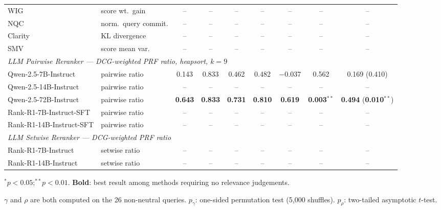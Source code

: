 \begin{table}[htbp]
{\begin{tabular}{@{}llccccccc@{}}
WIG~\cite{zhou2007query}
  & score wt.\ gain  & -- & -- & -- & -- & -- & -- & -- \\

NQC~\cite{shtok2012predicting}
  & norm.\ query commit.  & -- & -- & -- & -- & -- & -- & -- \\

Clarity~\cite{cronen2002predicting}
  & KL divergence  & -- & -- & -- & -- & -- & -- & -- \\

SMV~\cite{tao2014query}
  & score mean var.  & -- & -- & -- & -- & -- & -- & -- \\

\midrule
\multicolumn{9}{l}{\textit{LLM Pairwise Reranker --- DCG-weighted PRF ratio, heapsort, $k{=}9$}} \\[2pt]

Qwen-2.5-7B-Instruct
  & pairwise ratio
  & 0.143 & 0.833 & 0.462 & 0.482
  & $-$0.037 & 0.562
  & 0.169 \;(0.410) \\

Qwen-2.5-14B-Instruct
  & pairwise ratio  & -- & -- & -- & -- & -- & -- & -- \\

Qwen-2.5-72B-Instruct
  & pairwise ratio
  & \textbf{0.643} & \textbf{0.833} & \textbf{0.731} & \textbf{0.810}
  & \textbf{0.619} & \textbf{0.003}$^{**}$
  & \textbf{0.494} \;(\textbf{0.010}$^{**}$) \\

Rank-R1-7B-Instruct-SFT
  & pairwise ratio  & -- & -- & -- & -- & -- & -- & -- \\

Rank-R1-14B-Instruct-SFT
  & pairwise ratio  & -- & -- & -- & -- & -- & -- & -- \\

\midrule
\multicolumn{9}{l}{\textit{LLM Setwise Reranker --- DCG-weighted PRF ratio}} \\[2pt]

Rank-R1-7B-Instruct
  & setwise ratio  & -- & -- & -- & -- & -- & -- & -- \\

Rank-R1-14B-Instruct
  & setwise ratio  & -- & -- & -- & -- & -- & -- & -- \\

\bottomrule
\end{tabular}%
}
\begin{tablenotes}
\small
\item $^{*}p{<}0.05$;\quad $^{**}p{<}0.01$.
\quad \textbf{Bold}: best result among methods requiring no relevance judgements.
\item $\gamma$ and $\rho$ are both computed on the 26 non-neutral queries.
  $p_\gamma$: one-sided permutation test (5{,}000 shuffles).
  $p_\rho$: two-tailed asymptotic $t$-test.
\end{tablenotes}
\end{table}

